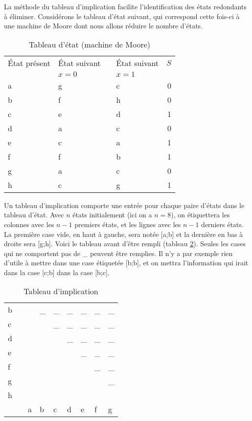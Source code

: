 \documentclass[11pt]{article}
\begin{document}
La méthode du tableau d'implication facilite l'identification des
états redondants à éliminer. Considérons le tableau d'état suivant,
qui correspond cette fois-ci à une machine de Moore dont nous allons
réduire le nombre d'états.

\begin{table}[htbp]
\caption{\label{tab:org3217451}Tableau d'état (machine de Moore)}
\centering
\begin{tabular}{llllr}
État présent & État suivant &  & État suivant & \(S\)\\
 & \(x=0\) &  & \(x=1\) & \\
\hline
a & g &  & c & 0\\
b & f &  & h & 0\\
c & e &  & d & 1\\
d & a &  & c & 0\\
e & c &  & a & 1\\
f & f &  & b & 1\\
g & a &  & c & 0\\
h & c &  & g & 1\\
\end{tabular}
\end{table}

Un tableau d'implication comporte une entrée pour chaque paire d'états
dans le tableau d'état. Avec \(n\) états initialement (ici on a
\(n=8\)), on étiquettera les colonnes avec les \(n-1\) premiers états,
et les lignes avec les \(n-1\) derniers états. La première case vide,
en haut à gauche, sera notée [a;b] et la dernière en bas à droite sera
[g;h]. Voici le tableau avant d'être rempli (tableau
\ref{tab:org0f852b6}). Seules les cases qui ne comportent pas de \_
peuvent être remplies. Il n'y a par exemple rien d'utile à mettre dans
une case étiquetée [b;b], et on mettra l'information qui irait dans la
case [c;b] dans la case [b;c].

\begin{table}[htbp]
\caption{\label{tab:org0f852b6}Tableau d'implication}
\centering
\begin{tabular}{lllllllll}
b &  &  & \_ & \_ & \_ & \_ & \_ & \_\\
c &  &  &  & \_ & \_ & \_ & \_ & \_\\
d &  &  &  &  & \_ & \_ & \_ & \_\\
e &  &  &  &  &  & \_ & \_ & \_\\
f &  &  &  &  &  &  & \_ & \_\\
g &  &  &  &  &  &  &  & \_\\
h &  &  &  &  &  &  &  & \\
\hline
 &  & a & b & c & d & e & f & g\\
\end{tabular}
\end{table}
\end{document}

